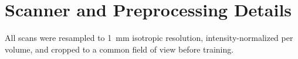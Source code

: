 \chapter{Scanner and Preprocessing Details}
\label{app:a}

All scans were resampled to 1~mm isotropic resolution, intensity-normalized per volume, and
cropped to a common field of view before training.
